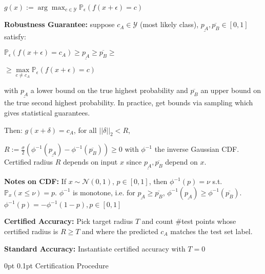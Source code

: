 \documentclass[11pt,landscape,a4paper,fleqn]{article}
\makeatletter
\renewcommand{\subsection}{\@startsection{subsection}{1}{0mm}%
                                {0pt}%
                                {0.1pt}%
                            	{\color{myorange2}\sffamily\small}}
\makeatother
\begin{document}
\begin{multicols*}{4}
$g(x) := \arg \max_{c \in \mathcal{Y}} \mathbb{P}_\epsilon (f(x + \epsilon) = c)$

\vspace*{1mm}
\textbf{Robustness Guarantee:} suppose $c_A \in \mathcal{Y}$ (most likely class), $\underline{p_A}, \overline{p_B} \in [0,1]$ satisfy:

$\mathbb{P}_\epsilon(f(x + \epsilon) = c_A) \geq \underline{p_A} \geq \overline{p_B} \geq$

$\geq \max\limits_{c \neq c_A} \mathbb{P}_\epsilon (f(x + \epsilon) = c)$

with $\underline{p_A}$ a lower bound on the true highest probability and $\overline{p_B}$ an upper bound on the true second highest probability. In practice, get bounds via sampling which gives statistical guarantees.

Then: {$g(x + \delta) = c_A$, for all $||\delta||_2 < R$}, 

$R := \frac{\sigma}{2}(\phi^{-1}(\underline{p_A}) - \phi^{-1}(\overline{p_B})) \geq 0$ with $\phi^{-1}$ the inverse Gaussian CDF. Certified radius $R$ depends on input $x$ since $\underline{p_A}, \overline{p_B}$ depend on $x$.

\vspace*{1mm}
\textbf{Notes on CDF:} If $x \sim \mathcal{N}(0,1)$, $p \in [0,1]$, then $\phi^{-1}(p) = \nu$ s.t. $\mathbb{P}_x (x \leq \nu) = p$. $\phi^{-1}$ is monotone, i.e. for $\underline{p_A} \geq \overline{p_B}$, $\phi^{-1}(\underline{p_A}) \geq \phi^{-1}(\overline{p_B})$.
$\phi^{-1}(p) = -\phi^{-1}(1-p), p \in [0,1]$

\vspace*{1mm}
\textbf{Certified Accuracy:} Pick target radius $T$ and count \#test points whose certified radius is $R \geq T$ and where the predicted $c_A$ matches the test set label.

\textbf{Standard Accuracy:} Instantiate certified accuracy with $T = 0$

\vspace*{1mm}
\subsection{Certification Procedure}


\end{multicols*}
\end{document}
